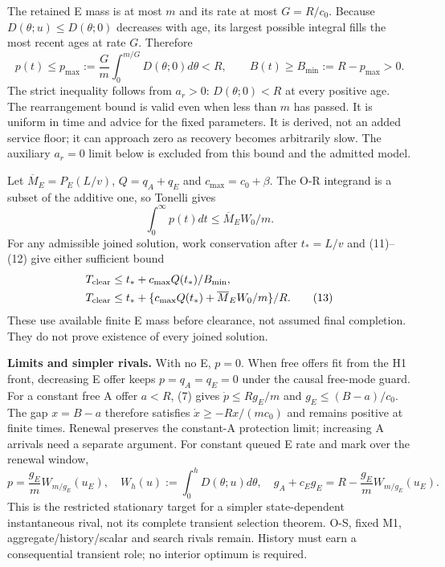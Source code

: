 \documentclass[11pt,a4paper]{article}
\begin{document}
The retained E mass is at most $m$ and its rate at most $G=R/c_0$.
Because $D(\theta;u)\leq D(\theta;0)$ decreases with age, its largest
possible integral fills the most recent ages at rate $G$. Therefore
\begin{equation}
 p(t)\leq p_{\max}:=\frac Gm\int_0^{m/G}D(\theta;0)d\theta<R,
 \qquad B(t)\geq B_{\min}:=R-p_{\max}>0. \tag{11}
\end{equation}
The strict inequality follows from $a_r>0$: $D(\theta;0)<R$ at every
positive age. The rearrangement bound is valid even when less than $m$
has passed. It is uniform in time and advice for the fixed parameters.
It is derived, not an added service floor; it can approach zero as recovery
becomes arbitrarily slow. The auxiliary $a_r=0$ limit below is excluded
from this bound and the admitted model.

Let $\overline M_E=P_E(L/v)$, $Q=q_A+q_E$ and $c_{\max}=c_0+\beta$.
The O-R integrand is a subset of the additive one, so Tonelli gives
\begin{equation}
 \int_0^\infty p(t)dt\leq\overline M_E W_0/m. \tag{12}
\end{equation}
For any admissible joined solution, work conservation after $t_*=L/v$
and (11)--(12) give either sufficient bound
\begin{align}
 T_{\rm clear}&\leq t_*+c_{\max}Q(t_*)/B_{\min},\nonumber\\
 T_{\rm clear}&\leq t_*+
       \{c_{\max}Q(t_*)+\overline M_EW_0/m\}/R. \tag{13}
\end{align}
These use available finite E mass before clearance, not assumed final
completion. They do not prove existence of every joined solution.

\textbf{Limits and simpler rivals.} With no E, $p=0$. When free offers
fit from the H1 front, decreasing E offer keeps $p=q_A=q_E=0$ under the
causal free-mode guard. For a constant free A offer $a<R$, (7) gives
$\dot p\leq Rg_E/m$ and $g_E\leq(B-a)/c_0$. The gap $x=B-a$ therefore
satisfies $\dot x\geq-Rx/(mc_0)$ and remains positive at finite times.
Renewal preserves the constant-A protection limit; increasing A arrivals
need a separate argument. For constant queued E rate and mark over the
renewal window,
\begin{equation}
 p=\frac{g_E}{m}W_{m/g_E}(u_E),\quad
 W_h(u):=\int_0^hD(\theta;u)d\theta,\quad
 g_A+c_Eg_E=R-\frac{g_E}{m}W_{m/g_E}(u_E). \tag{14}
\end{equation}
This is the restricted stationary target for a simpler state-dependent
instantaneous rival, not its complete transient selection theorem. O-S,
fixed M1, aggregate/history/scalar and search rivals remain. History must
earn a consequential transient role; no interior optimum is required.
\end{document}
